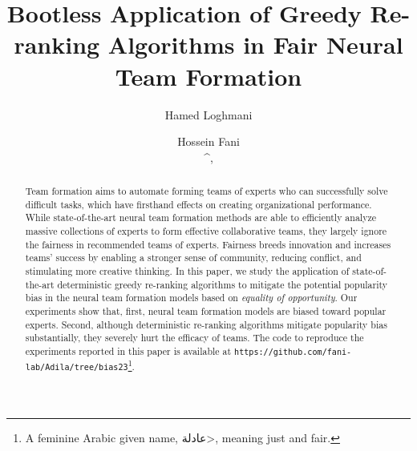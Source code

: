 \documentclass[runningheads]{llncs}
\author{}
\institute{}
\begin{document}
%
\title{Bootless Application of Greedy Re-ranking Algorithms in Fair Neural Team Formation}


\author{Hamed Loghmani\and
Hossein Fani\\^,  }


%
\maketitle              %
%
\begin{abstract}
Team formation aims to automate forming teams of experts who can successfully solve difficult tasks, which have firsthand effects on creating organizational performance. While state-of-the-art neural team formation methods are able to efficiently analyze massive collections of experts to form effective collaborative teams, they largely ignore the fairness in recommended teams of experts. Fairness breeds innovation and increases teams' success by enabling a stronger sense of community, reducing conflict, and stimulating more creative thinking. In this paper, we study the application of state-of-the-art deterministic greedy re-ranking algorithms to mitigate the potential popularity bias in the neural team formation models based on \textit{equality of opportunity}. Our experiments show that, first, neural team formation models are biased toward popular experts. Second, although deterministic re-ranking algorithms mitigate popularity bias substantially, they severely hurt the efficacy of teams. The code to reproduce the experiments reported in this paper is available at \texttt{https://github.com/fani-lab/Adila/tree/bias23}\footnote{ A feminine Arabic given name, \<عادلة>, meaning just and fair.}.


\end{abstract}
%
%
%
\end{document}
